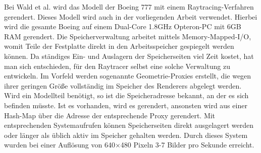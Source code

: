 Bei Wald et al. \cite{wald} wird das Modell der Boeing 777 mit einem Raytracing-Verfahren gerendert. Dieses Modell wird auch in der vorliegenden Arbeit verwendet. Hierbei wird die gesamte Boeing auf einem Dual-Core 1.8GHz Opteron-PC mit 6GB RAM gerendert. Die Speicherverwaltung arbeitet mittels Memory-Mapped-I/O, womit Teile der Festplatte direkt in den Arbeitsspeicher gespiegelt werden können. Da ständiges Ein- und Auslagern der Speicherseiten viel Zeit kostet, hat man sich entschieden, für den Raytracer selbst eine solche Verwaltung zu entwickeln. Im Vorfeld werden sogenannte Geometrie-Proxies erstellt, die wegen ihrer geringen Größe vollständig im Speicher des Renderers abgelegt werden. Wird ein Modellteil benötigt, so ist die Speicheradresse bekannt, an der es sich befinden müsste. Ist es vorhanden, wird es gerendert, ansonsten wird aus einer Hash-Map über die Adresse der entsprechende Proxy gerendert. Mit entsprechenden Systemaufrufen können Speicherseiten direkt ausgelagert werden oder länger als üblich aktiv im Speicher gehalten werden. Durch dieses System wurden bei einer Auflösung von 640$\times$480 Pixeln 3-7 Bilder pro Sekunde erreicht.

%
